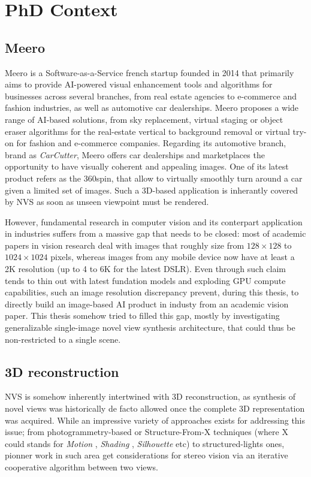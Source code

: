 \section{PhD Context}

\subsection{Meero}
Meero is a Software-as-a-Service french startup founded in 2014 that primarily aims to provide \ac{AI}-powered visual enhancement tools and algorithms for businesses across several branches, from real estate agencies to e-commerce and fashion industries, as well as automotive car dealerships. Meero proposes a wide range of \ac{AI}-based solutions, from sky replacement, virtual staging or object eraser algorithms for the real-estate vertical to background removal or virtual try-on for fashion and e-commerce companies. Regarding its automotive branch, brand as \textit{CarCutter}, Meero offers car dealerships and marketplaces the opportunity to have visually coherent and appealing images. One of its latest product refers as the 360\degree spin, that allow to virtually smoothly turn around a car given a limited set of images. Such a 3D-based application is inherantly covered by \ac{NVS} as soon as unseen viewpoint must be rendered. 

However, fundamental research in computer vision and its conterpart application in industries suffers from a massive gap that needs to be closed: most of academic papers in vision research deal with images that roughly size from $128\times128$ to $1024\times1024$ pixels, whereas images from any mobile device now have at least a 2K resolution (up to 4 to 6K for the latest \ac{DSLR}). Even through such claim tends to thin out with latest fundation models and exploding \ac{GPU} compute capabilities, such an image resolution discrepancy prevent, during this thesis, to directly build an image-based \ac{AI} product in industy from an academic vision paper. This thesis somehow tried to filled this gap, mostly by investigating generalizable single-image novel view synthesis architecture, that could thus be non-restricted to a single scene. 

\subsection{3D reconstruction}
 \ac{NVS} is somehow inherently intertwined with 3D reconstruction, as synthesis of novel views was historically de facto allowed once the complete 3D representation was acquired. While an impressive variety of approaches exists for addressing this issue; from photogrammetry-based or Structure-From-X techniques (where X could stands for \textit{Motion} \citep{longuet1981computer}, \textit{Shading} \citep{horn1989obtaining}, \textit{Silhouette}\citep{baumgart1974geometric} etc) to structured-lights ones, pionner work in such area get considerations for stereo vision \citep{marr1976cooperative} via an iterative cooperative algorithm between two views. 
 
